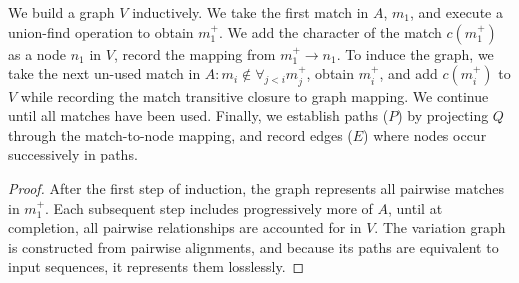 \documentclass{bioinfo}
\theoremstyle{definition}
\begin{document}
We build a graph $V$ inductively.
We take the first match in $A$, $m_1$, and execute a union-find operation to obtain $m_1^+$.
We add the character of the match $c(m_1^+)$ as a node $n_1$ in $V$, record the mapping from $m_1^+ \to n_1$.
To induce the graph, we take the next un-used match in $A : m_i \notin \forall_{j < i} m_j^+$, obtain $m_i^+$, and add $c(m_i^+)$ to $V$ while recording the match transitive closure to graph mapping.
We continue until all matches have been used.
Finally, we establish paths ($P$) by projecting $Q$ through the match-to-node mapping, and record edges ($E$) where nodes occur successively in paths.

\begin{proof}
After the first step of induction, the graph represents all pairwise matches in $m_1^+$.
Each subsequent step includes progressively more of $A$, until at completion, all pairwise relationships are accounted for in $V$.
The variation graph is constructed from pairwise alignments, and because its paths are equivalent to input sequences, it represents them losslessly.
\end{proof}
\end{document}
